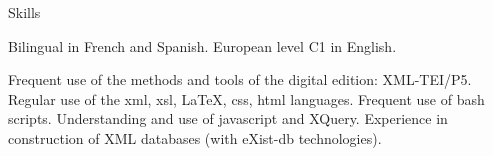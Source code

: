 











\begin{rubric}{Skills}
                    \entry*
                    
                Bilingual in French and Spanish. European level C1 in English.
                    \entry*
                    
                Frequent use of the methods and tools of the digital edition: XML-TEI/P5.
                    Regular use of the xml, xsl, LaTeX, css, html languages. Frequent use of bash
                    scripts. Understanding and use of javascript and XQuery. Experience in
                    construction of XML databases (with eXist-db technologies).\end{rubric}



